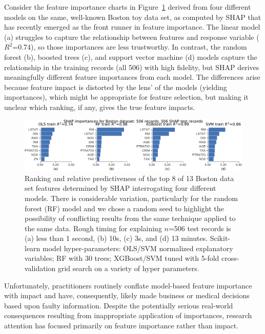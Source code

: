 \documentclass[11pt]{article}
\newcommand{\figref}[1]{Figure~\ref{#1}}
\begin{document}
Consider the feature importance charts in \figref{fig:diff-models} derived from four different models on the same, well-known Boston toy data set, as computed by SHAP that has recently emerged as the front runner in feature importance. The linear model (a) struggles to capture the relationship between features and response variable ($R^2$=0.74), so those importances are less trustworthy.  In contrast, the random forest (b), boosted trees (c), and support vector machine (d) models capture the relationship in the training records (all 506) with high fidelity, but SHAP derives meaningfully different feature importances from each model. The differences arise because feature impact is distorted by the lens' of the models (yielding importances), which might be appropriate for feature selection, but making it unclear which ranking, if any, gives the true feature impacts. 

\begin{figure}[htbp]
\begin{center}
\includegraphics[scale=0.6]{images/diff-models.pdf}
\caption{\small Ranking and relative predictiveness of the top 8 of 13 Boston data set features determined by SHAP interrogating four different models.  There is considerable variation, particularly for the random forest (RF) model and we chose a random seed to highlight the possibility of conflicting results from the same technique applied to the same data. Rough timing for explaining $n$=506 test records is (a) less than 1 second, (b) 10s, (c) 3s, and (d) 13 minutes.  Scikit-learn model hyper-parameters: OLS/SVM normalized explanatory variables; RF with 30 trees; XGBoost/SVM tuned with 5-fold cross-validation grid search on a variety of hyper parameters.}
\label{fig:diff-models}
\end{center}
\end{figure}

Unfortunately, practitioners routinely conflate model-based feature importance with impact and have, consequently, likely made business or medical decisions based upon faulty information. Despite the potentially serious real-world consequences resulting from inappropriate application of importances, research attention has focused primarily on feature importance rather than impact. 
\end{document}
